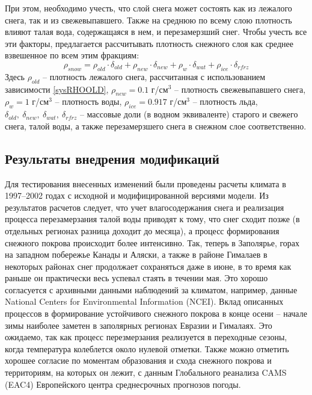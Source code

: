 \documentclass[a4paper, fontsize=14pt]{scrartcl}
\begin{document}
При этом, необходимо учесть, что слой снега может состоять как из лежалого снега, так и из свежевыпавшего. Также на среднюю по всему слою плотность влияют талая вода, содержащаяся в нем, и перезамерзший снег. Чтобы учесть все эти факторы, предлагается рассчитывать плотность снежного слоя как среднее взвешенное по всем этим фракциям:
\begin{equation}
    \rho_{snow} = \rho_{old} \cdot \delta_{old} + \rho_{new} \cdot \delta_{new} + \rho_{w} \cdot \delta_{wat} + \rho_{ice} \cdot \delta_{rfrz}
\end{equation}
Здесь $\rho_{old}$ -- плотность лежалого снега, рассчитанная с использованием зависимости \eqref{sysRHOOLD},  $\rho_{new} = 0.1$ г/см$^3$ -- плотность свежевыпавшего снега, $\rho_{w} = 1$ г/см$^3$ -- плотность воды, $\rho_{ice} = 0.917$ г/см$^3$ -- плотность льда, $\delta_{old}, ~\delta_{new}, ~\delta_{wat}, ~\delta_{rfrz}$ -- массовые доли (в водном эквиваленте) старого и свежего снега, талой воды, а также перезамерзшего снега в снежном слое соответственно.


\subsection{Результаты внедрения модификаций}

Для тестирования внесенных изменений были проведены расчеты климата в 1997--2002 годах с исходной и модифицированной версиями модели. Из результатов расчетов следует, что учет влагосодержания снега и реализация процесса перезамерзания талой воды приводят к тому, что снег сходит позже (в отдельных регионах разница доходит до месяца), а процесс формирования снежного покрова происходит более интенсивно. Так, теперь в Заполярье, горах на западном побережье Канады и Аляски, а также в районе Гималаев в некоторых районах снег продолжает сохраняться даже в июне, в то время как раньше он практически весь успевал стаять в течении мая. Это хорошо согласуется с архивными данными наблюдений за климатом, например, данные National Centers for Environmental Information (NCEI). Вклад описанных процессов в формирование устойчивого снежного покрова в конце осени -- начале зимы наиболее заметен в заполярных регионах Евразии и Гималаях. Это ожидаемо, так как процесс перезмерзания реализуется в переходные сезоны, когда температура колеблется около нулевой отметки. Также можно отметить хорошее согласие по моментам образования и схода снежного покрова и территориям, на которых он лежит, с данным Глобального реанализа CAMS (EAC4) Европейского центра среднесрочных прогнозов погоды.
\end{document}

